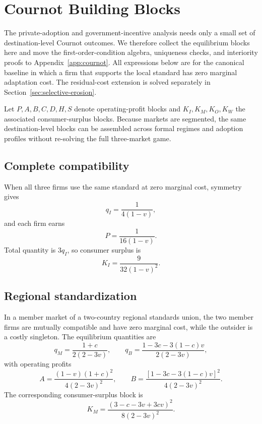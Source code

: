 \section{Cournot Building Blocks}
\label{sec:product-market}

The private-adoption and government-incentive analysis needs only a small set of destination-level Cournot outcomes. We therefore collect the equilibrium blocks here and move the first-order-condition algebra, uniqueness checks, and interiority proofs to Appendix~\ref{app:cournot}. All expressions below are for the canonical baseline in which a firm that supports the local standard has zero marginal adaptation cost. The residual-cost extension is solved separately in Section~\ref{sec:selective-erosion}.

Let $P,A,B,C,D,H,S$ denote operating-profit blocks and $K_I,K_M,K_O,K_W$ the associated consumer-surplus blocks. Because markets are segmented, the same destination-level blocks can be assembled across formal regimes and adoption profiles without re-solving the full three-market game.

\subsection{Complete compatibility}
\label{subsec:product-market-complete}

When all three firms use the same standard at zero marginal cost, symmetry gives
\begin{equation}
    q_I=\frac{1}{4(1-v)},
    \label{eq:qI}
\end{equation}
and each firm earns
\begin{equation}
    P=\frac{1}{16(1-v)}.
    \label{eq:profit-P}
\end{equation}
Total quantity is $3q_I$, so consumer surplus is
\begin{equation}
    K_I=\frac{9}{32(1-v)^2}.
    \label{eq:KI}
\end{equation}

\subsection{Regional standardization}
\label{subsec:product-market-regional}

In a member market of a two-country regional standards union, the two member firms are mutually compatible and have zero marginal cost, while the outsider is a costly singleton. The equilibrium quantities are
\begin{equation}
    q_M=\frac{1+c}{2(2-3v)},
    \qquad
    q_B=\frac{1-3c-3(1-c)v}{2(2-3v)},
    \label{eq:quantities-su-member}
\end{equation}
with operating profits
\begin{equation}
    A=\frac{(1-v)(1+c)^2}{4(2-3v)^2},
    \qquad
    B=\frac{[1-3c-3(1-c)v]^2}{4(2-3v)^2}.
    \label{eq:profits-su-member}
\end{equation}
The corresponding consumer-surplus block is
\begin{equation}
    K_M
    =\frac{(3-c-3v+3cv)^2}{8(2-3v)^2}.
    \label{eq:KM}
\end{equation}


